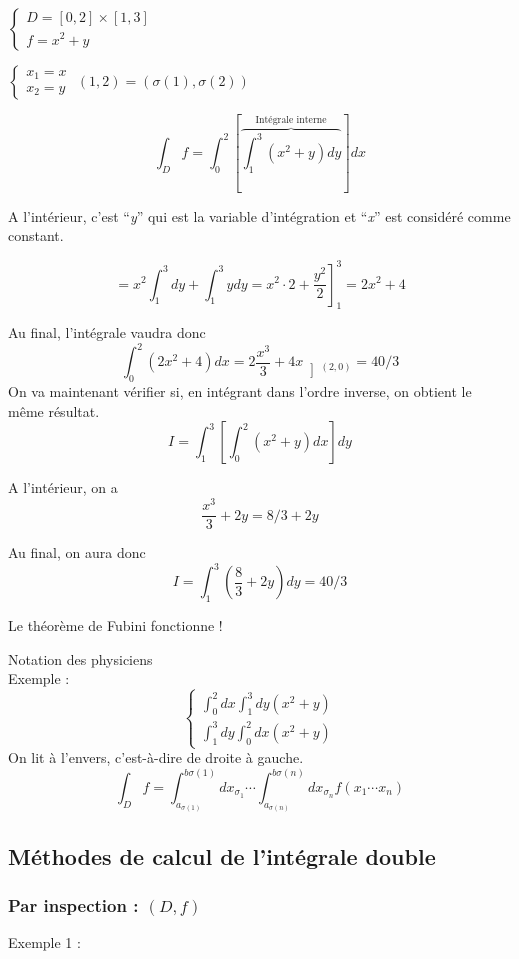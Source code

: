 $ \left\{
\begin{array}{l}
D = [0,2]\times[1,3]\\
f = x^2+y
\end{array}
\right.
$

$
 \left\{
\begin{array}{l}
x_1=x\\
x_2=y
\end{array}
\right.
$
$(1,2)=(\sigma(1),\sigma(2))$

\[\int_D f = \int_0^2 \left[ \overbrace{\int_1^3 (x^2+y) dy}^{\text{Intégrale interne}}\right] dx\]

A l'intérieur, c'est ``\textit{y}'' qui est la variable d'intégration et ``\textit{x}'' est considéré comme constant.

\[=x^2\int_1^3 dy+\int _1^3 y dy = x^2 \cdot 2+\left.\frac{y^2}{2}\right]_1^3 = 2x^2+4\]

Au final, l'intégrale vaudra donc
\[  \int_0^2(2x^2+4)dx = 2\frac{x^3}{3}+4x \left]_{(2,0)} \right.= 40/3\]
On va maintenant vérifier si, en intégrant dans l'ordre inverse, on obtient le même résultat.
\[I = \int_1^3 \left[ \int_0^2 (x^2+y)dx \right] dy\]

A l'intérieur, on a \[\frac{x^3}{3}+2y = 8/3 + 2y\]

Au final, on aura donc \[I = \int_1^3(\frac{8}{3}+2y)dy = 40/3\]

Le théorème de Fubini fonctionne !

\begin{myrem}
Notation des physiciens\\
Exemple :
$$\left\{
\begin{array}{l}
\int_0^2dx\int_1^3dy (x^2+y)\\
\int_1^3dy\int_0^2 dx ( x^2+y)
\end{array}
\right.
$$
On lit à l'envers, c'est-à-dire de droite à gauche.
\[\int_D f = \int_{a_{\sigma(1)}}^{b{\sigma(1)}} dx_{\sigma_1} \cdots \int_{a_{\sigma(n)}}^{b{\sigma(n)}} dx_{\sigma_n} f(x_1 \cdots x_n)\]

\end{myrem}

\subsection{Méthodes de calcul de l'intégrale double}
\subsubsection{Par inspection : $(D,f)$}
Exemple 1 :

